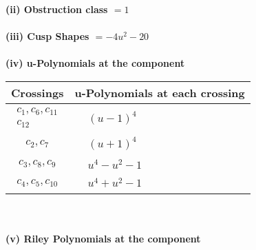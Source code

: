 \documentclass[1p]{elsarticle_modified}
\theoremstyle{definition}
\begin{document}
\flushleft \textbf{(ii) Obstruction class $= 1$}\\~\\
\flushleft \textbf{(iii) Cusp Shapes $= -4 u^2-20$}\\~\\
\newpage\renewcommand{\arraystretch}{1}
\flushleft \textbf{(iv) u-Polynomials at the component}\newline \\
\begin{tabular}{m{50pt}|m{274pt}}
Crossings & \hspace{64pt}u-Polynomials at each crossing \\
\hline $$\begin{aligned}c_{1},c_{6},c_{11}\\c_{12}\end{aligned}$$&$\begin{aligned}
&(u-1)^4
\end{aligned}$\\
\hline $$\begin{aligned}c_{2},c_{7}\end{aligned}$$&$\begin{aligned}
&(u+1)^4
\end{aligned}$\\
\hline $$\begin{aligned}c_{3},c_{8},c_{9}\end{aligned}$$&$\begin{aligned}
&u^4- u^2-1
\end{aligned}$\\
\hline $$\begin{aligned}c_{4},c_{5},c_{10}\end{aligned}$$&$\begin{aligned}
&u^4+u^2-1
\end{aligned}$\\
\hline
\end{tabular}\\~\\
\newpage\renewcommand{\arraystretch}{1}
\flushleft \textbf{(v) Riley Polynomials at the component}\newline \\
\end{document}
